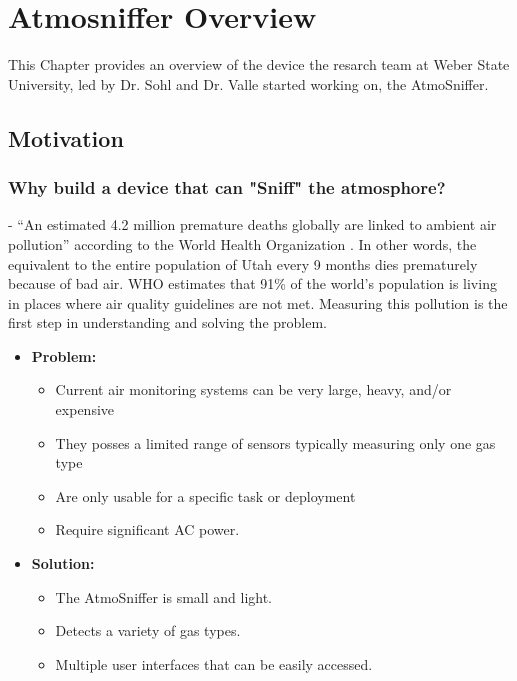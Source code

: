 \chapter{Atmosniffer Overview} %
This Chapter provides an overview of the device the resarch team at Weber State University, led by Dr. Sohl and Dr. Valle started working on, the AtmoSniffer.

\section{Motivation}

\subsection{Why build a device that can "Sniff" the atmosphore?}
- “An estimated 4.2 million premature deaths globally are linked to ambient air pollution” according to the World Health Organization \cite{who}. In other words, the equivalent to the entire population of Utah every 9 months dies prematurely because of bad air. WHO estimates that 91\% of the world’s population is living in places where air quality guidelines are not met.\cite{who} Measuring this pollution is the first step in understanding and solving the problem. 


\begin{itemize}
\item \textbf{Problem:}
	\begin{itemize}
	\item Current air monitoring systems can be very large, heavy, and/or expensive
	\item They posses a limited range of sensors typically measuring only one gas type
	\item Are only usable for a specific task or deployment
	\item Require significant AC power.
	\end{itemize}

\item \textbf{Solution:}
	\begin{itemize}
	\item The AtmoSniffer is small and light.
	\item Detects a variety of gas types.
	\item Multiple user interfaces that can be easily accessed.
	\end{itemize}

\end{itemize}

